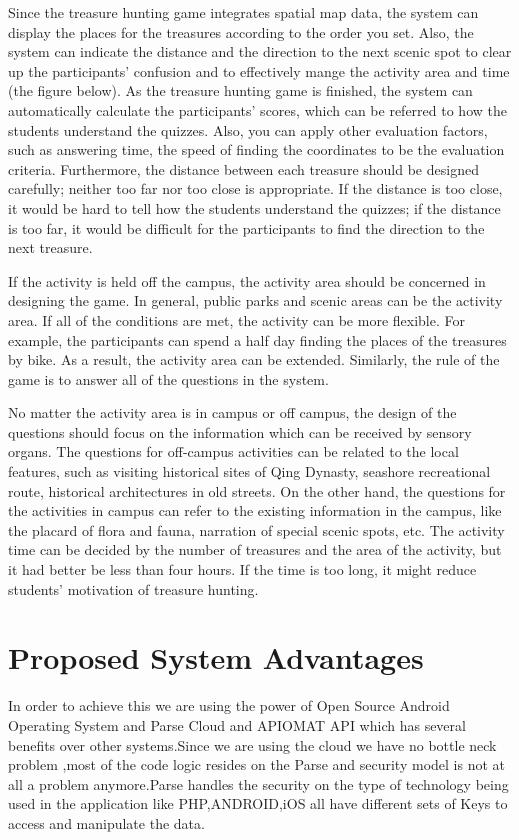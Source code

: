 	Since the treasure hunting game integrates spatial map data, the system can display the places for the treasures according to the order you set. Also, the system can indicate the distance and the direction to the next scenic spot to clear up the participants’ confusion and to effectively mange the activity area and time (the figure below). As the treasure hunting game is finished, the system can automatically calculate the participants’ scores, which can be referred to how the students understand the quizzes. Also, you can apply other evaluation factors, such as answering time, the speed of finding the coordinates to be the evaluation criteria. Furthermore, the distance between each treasure should be designed carefully; neither too far nor too close is appropriate. If the distance is too close, it would be hard to tell how the students understand the quizzes; if the distance is too far, it would be difficult for the participants to find the direction to the next treasure.
	
	If the activity is held off the campus, the activity area should be concerned in designing the game. In general, public parks and scenic areas can be the activity area. If all of the conditions are met, the activity can be more flexible. For example, the participants can spend a half day finding the places of the treasures by bike. As a result, the activity area can be extended. Similarly, the rule of the game is to answer all of the questions in the system.
	
	No matter the activity area is in campus or off campus, the design of the questions should focus on the information which can be received by sensory organs. The questions for off-campus activities can be related to the local features, such as visiting historical sites of Qing Dynasty, seashore recreational route, historical architectures in old streets. On the other hand, the questions for the activities in campus can refer to the existing information in the campus, like the placard of flora and fauna, narration of special scenic spots, etc. The activity time can be decided by the number of treasures and the area of the activity, but it had better be less than four hours. If the time is too long, it might reduce students’ motivation of treasure hunting.
	
	
	
	
	
	
	\section{Proposed  System Advantages}
	In order to achieve this we are using the power of Open Source Android Operating System and Parse Cloud and APIOMAT API which has several benefits over other systems.Since we are using the cloud we have no bottle neck problem ,most of the code logic resides on the Parse
	and security model is not at all a problem anymore.Parse handles the security on the type of technology being used in the application like PHP,ANDROID,iOS all have different sets of Keys to access and manipulate the data.
	
